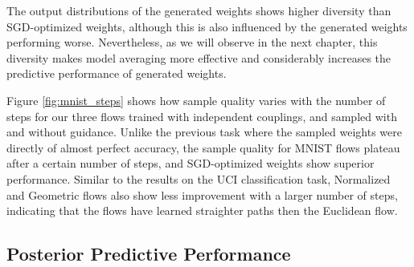 The output distributions of the generated weights shows higher diversity than SGD-optimized weights, although this is also influenced by the generated weights performing worse. Nevertheless, as we will observe in the next chapter, this diversity makes model averaging more effective and considerably increases the predictive performance of generated weights. 

Figure \ref{fig:mnist_steps} shows how sample quality varies with the number of steps for our three flows trained with independent couplings, and sampled with and without guidance. Unlike the previous task where the sampled weights were directly of almost perfect accuracy, the sample quality for MNIST flows plateau after a certain number of steps, and SGD-optimized weights show superior performance. Similar to the results on the UCI classification task, Normalized and Geometric flows also show less improvement with a larger number of steps, indicating that the flows have learned straighter paths then the Euclidean flow. 

\subsection{Posterior Predictive Performance} \label{sec:posterior_predictive}

